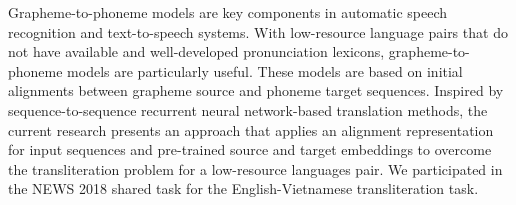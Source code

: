 Grapheme-to-phoneme models are key components in automatic speech recognition and text-to-speech systems. With low-resource language pairs that do not have available and well-developed pronunciation lexicons, grapheme-to-phoneme models are particularly useful. These models are based on initial alignments between grapheme source and phoneme target sequences. Inspired by sequence-to-sequence recurrent neural network-based translation methods, the current research presents an approach that applies an alignment representation for input sequences and pre-trained source and target embeddings to overcome the transliteration problem for a low-resource languages pair. We participated in the NEWS 2018 shared task for the English-Vietnamese transliteration task.
